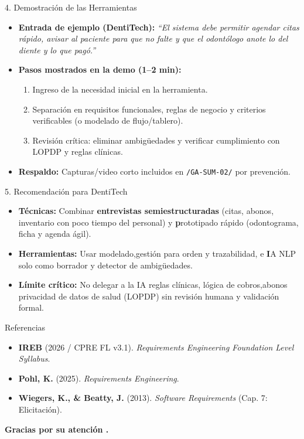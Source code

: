 \documentclass[aspectratio=169,10pt]{beamer}
\begin{document}
\begin{frame}{4. Demostración  de las Herramientas}
  \begin{itemize}
    \item \textbf{Entrada de ejemplo (DentiTech):} \textit{``El sistema debe permitir agendar citas rápido, avisar al paciente para que no falte y que el odontólogo anote lo del diente y lo que pagó.''}
    \item \textbf{Pasos mostrados en la demo (1--2 min):}
      \begin{enumerate}
        \item Ingreso de la necesidad inicial en la herramienta.
        \item Separación en requisitos funcionales, reglas de negocio y criterios verificables (o modelado de flujo/tablero).
        \item Revisión crítica: eliminar ambigüedades y verificar cumplimiento con LOPDP y reglas clínicas.
      \end{enumerate}
    \item \textbf{Respaldo:} Capturas/video corto incluidos en \texttt{/GA-SUM-02/} por prevención.
  \end{itemize}
\end{frame}

\begin{frame}{5. Recomendación  para DentiTech}
  \begin{itemize}
    \item \textbf{Técnicas:} Combinar \textbf{entrevistas semiestructuradas} (citas, abonos, inventario con poco tiempo del personal) y \textbf prototipado rápido (odontograma, ficha y agenda ágil).
    \item \textbf{Herramientas:} Usar  modelado,gestión para orden y trazabilidad, e \textbf IA NLP solo como borrador y detector de ambigüedades.
    \item \textbf{Límite crítico:} No delegar a la IA reglas clínicas, lógica de cobros,abonos  privacidad de datos de salud (LOPDP) sin revisión humana y validación formal.
  \end{itemize}
\end{frame}

\begin{frame}{Referencias }
  \begin{itemize}
    \item \textbf{IREB} (2026 / CPRE FL v3.1). \textit{Requirements Engineering Foundation Level Syllabus}.
    \item \textbf{Pohl, K.} (2025). \textit{Requirements Engineering}.
    \item \textbf{Wiegers, K., \& Beatty, J.} (2013). \textit{Software Requirements} (Cap. 7: Elicitación).
  \end{itemize}
  \vspace{0.3cm}
  \centering
  \textbf{Gracias por su atención .}
\end{frame}
\end{document}
